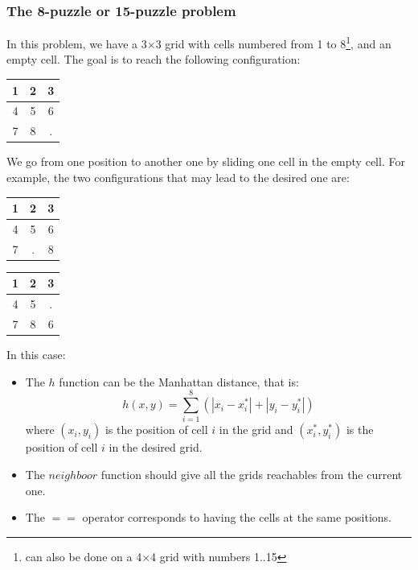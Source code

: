 \documentclass{ecnreport}
\begin{document}
\subsubsection{The 8-puzzle or 15-puzzle problem}

In this problem, we have a 3$\times$3 grid with cells numbered from 1 to 8\footnote{can also be done on a 4$\times$4 grid with numbers 1..15}, and an empty cell.
The goal is to reach the following configuration:
\begin{center}
 \begin{tabular}{|c|c|c|}
 \hline  
 1 &2&3\\\hline
 4 &5&6\\\hline
 7&8&.\\\hline
 \end{tabular}
\end{center}
We go from one position to another one by sliding one cell in the empty cell. For example, the two configurations that may lead to the desired one are:
\begin{center}
 
 \begin{tabular}{|c|c|c|}
 \hline  
 1 &2&3\\\hline
 4 &5&6\\\hline
 7&.&8\\\hline
 \end{tabular}\quad\quad\quad
 \begin{tabular}{|c|c|c|}
 \hline  
 1 &2&3\\\hline
 4 &5&.\\\hline
 7&8&6\\\hline
 \end{tabular}
\end{center}

In this case:
\begin{itemize}
 \item The $h$ function can be the Manhattan distance, that is:
 \begin{equation*}
  h(x,y) = \sum_{i=1}^8(|x_i - x_i^*| + |y_i - y_i^*|)
 \end{equation*}where $(x_i,y_i)$ is the position of cell $i$ in the grid and $(x_i^*,y_i^*)$ is the position
 of cell $i$ in the desired grid.
 \item The $neighboor$ function should give all the grids reachables from the current one.
 \item The $==$ operator corresponds to having the cells at the same positions.
\end{itemize}
\end{document}
